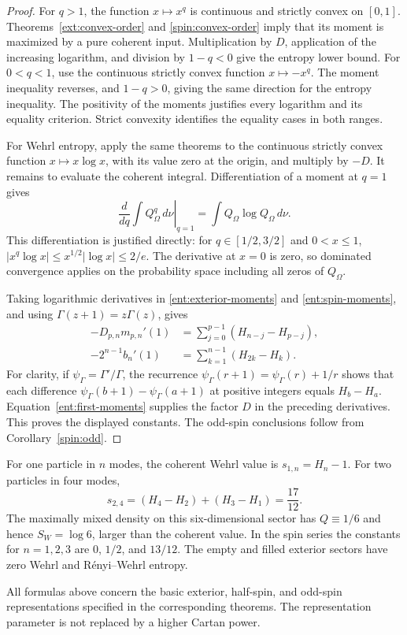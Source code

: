 \begin{proof}
For $q>1$, the function $x\mapsto x^q$ is continuous and strictly
convex on $[0,1]$. Theorems~\ref{ext:convex-order} and
\ref{spin:convex-order} imply that its moment is maximized by a
pure coherent input. Multiplication by $D$, application of the
increasing logarithm, and division by $1-q<0$ give the entropy
lower bound. For $0<q<1$, use the continuous strictly convex
function $x\mapsto-x^q$. The moment inequality reverses, and
$1-q>0$, giving the same direction for the entropy inequality.
The positivity of the moments justifies every logarithm and its
equality criterion. Strict convexity identifies the equality cases
in both ranges.

For Wehrl entropy, apply the same theorems to the continuous strictly
convex function $x\mapsto x\log x$, with its value zero at the
origin, and multiply by $-D$. It remains to evaluate the coherent
integral. Differentiation of a moment at $q=1$ gives
\[
 \left.\frac{d}{dq}\int Q_\Omega^q\,d\nu\right|_{q=1}
 =\int Q_\Omega\log Q_\Omega\,d\nu.
\]
This differentiation is justified directly: for
$q\in[1/2,3/2]$ and $0<x\le1$,
$|x^q\log x|\le x^{1/2}|\log x|\le2/e$.
The derivative at $x=0$ is zero, so dominated convergence applies
on the probability space including all zeros of $Q_\Omega$.

Taking logarithmic derivatives in
\eqref{ent:exterior-moments} and \eqref{ent:spin-moments}, and
using $\Gamma(z+1)=z\Gamma(z)$, gives
\begin{align*}
 -D_{p,n}m_{p,n}'(1)
 &=\sum_{j=0}^{p-1}(H_{n-j}-H_{p-j}),\\
 -2^{n-1}b_n'(1)
 &=\sum_{k=1}^{n-1}(H_{2k}-H_k).
\end{align*}
For clarity, if $\psi_\Gamma=\Gamma'/\Gamma$, the recurrence
$\psi_\Gamma(r+1)=\psi_\Gamma(r)+1/r$ shows that each difference
$\psi_\Gamma(b+1)-\psi_\Gamma(a+1)$ at positive integers equals
$H_b-H_a$. Equation~\eqref{ent:first-moments} supplies the factor
$D$ in the preceding derivatives. This proves the displayed constants.
The odd-spin conclusions follow from Corollary~\ref{spin:odd}.
\end{proof}

\begin{example}
\label{ent:examples}
For one particle in $n$ modes, the coherent Wehrl value is
$s_{1,n}=H_n-1$. For two particles in four modes,
\[
 s_{2,4}=(H_4-H_2)+(H_3-H_1)=\frac{17}{12}.
\]
The maximally mixed density on this six-dimensional sector has
$Q\equiv1/6$ and hence $S_W=\log6$, larger than the coherent
value. In the spin series the constants for $n=1,2,3$ are
$0$, $1/2$, and $13/12$. The empty and filled exterior sectors
have zero Wehrl and R\'enyi--Wehrl entropy.
\end{example}

All formulas above concern the basic exterior, half-spin, and odd-spin
representations specified in the corresponding theorems. The
representation parameter is not replaced by a higher Cartan power.
